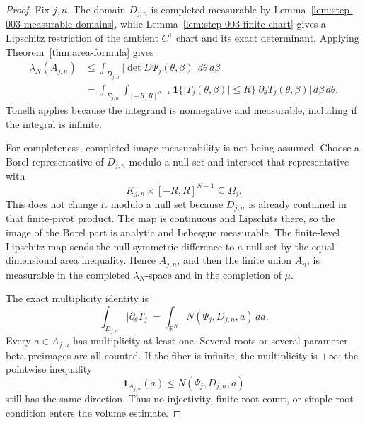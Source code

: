 \begin{proof}
Fix \(j,n\). The domain \(D_{j,n}\) is completed measurable by
Lemma~\ref{lem:step-003-measurable-domains}, while
Lemma~\ref{lem:step-003-finite-chart} gives a Lipschitz restriction of the ambient \(C^1\) chart and its exact
    determinant. Applying Theorem~\ref{thm:area-formula} gives
\begin{equation}
\label{eq:appendix-display-083}
\begin{aligned}
\lambda_N(A_{j,n})
&\leq
\int_{D_{j,n}}\lvert\det D\Psi_j(\theta,\beta)\rvert\,d\theta\,d\beta\\
&=
\int_{E_{j,n}}\int_{[-R,R]^{N-1}}
\mathbf 1\{\lvert T_j(\theta,\beta)\rvert\leq R\}
\lvert\partial_\theta T_j(\theta,\beta)\rvert
\,d\beta\,d\theta.
\end{aligned}
\end{equation}
Tonelli applies because the integrand is nonnegative and measurable, including if the integral is infinite.

For completeness, completed image measurability is not being assumed. Choose a Borel representative of
\(D_{j,n}\) modulo a null set and intersect that representative with
\begin{equation}
\label{eq:appendix-display-084}
K_{j,n}\times[-R,R]^{N-1}\subseteq\Omega_j.
\end{equation}
This does not change it modulo a null set because \(D_{j,n}\) is already contained in that finite-pivot
product. The map is continuous and Lipschitz there, so the image of the Borel part is analytic and Lebesgue
measurable.
The finite-level Lipschitz map sends the null symmetric difference to a null set by the equal-dimensional
area inequality. Hence \(A_{j,n}\), and then the finite union \(A_n\), is measurable in the completed
\(\lambda_N\)-space and in the completion of \(\mu\).

The exact multiplicity identity is
\begin{equation}
\label{eq:appendix-display-085}
\int_{D_{j,n}}\lvert\partial_\theta T_j\rvert
=
\int_{\mathbb R^N}
N(\Psi_j,D_{j,n},a)\,da.
\end{equation}
Every \(a\in A_{j,n}\) has multiplicity at least one. Several roots or several parameter-beta preimages are
all counted. If the fiber is infinite, the multiplicity is \(+\infty\); the pointwise inequality
\begin{equation}
\label{eq:appendix-display-086}
\mathbf 1_{A_{j,n}}(a)
\leq N(\Psi_j,D_{j,n},a)
\end{equation}
still has the same direction. Thus no injectivity, finite-root count, or simple-root condition enters the
volume estimate.


\end{proof}
